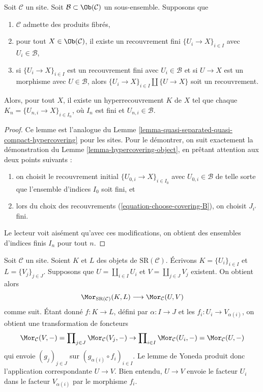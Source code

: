 \begin{lemma}
\label{lemma-w-contractible}
Soit $\mathcal{C}$ un site. Soit $\mathcal{B} \subset \Ob(\mathcal{C})$
un sous-ensemble. Supposons que
\begin{enumerate}
\item $\mathcal{C}$ admette des produits fibrés,
\item pour tout $X \in \Ob(\mathcal{C})$, il existe un recouvrement fini
$\{U_i \to X\}_{i \in I}$ avec $U_i \in \mathcal{B}$,
\item si $\{U_i \to X\}_{i \in I}$ est un recouvrement fini avec
$U_i \in \mathcal{B}$ et si $U \to X$ est un morphisme avec $U \in \mathcal{B}$,
alors $\{U_i \to X\}_{i \in I} \amalg \{U \to X\}$ soit un recouvrement.
\end{enumerate}
Alors, pour tout $X$, il existe un hyperrecouvrement $K$ de $X$
tel que chaque $K_n = \{U_{n, i} \to X\}_{i \in I_n}$, où
$I_n$ est fini et $U_{n, i} \in \mathcal{B}$.
\end{lemma}

\begin{proof}
Ce lemme est l'analogue du
Lemme \ref{lemma-quasi-separated-quasi-compact-hypercovering}
pour les sites. Pour le démontrer, on suit exactement la démonstration du
Lemme \ref{lemma-hypercovering-object},
en prêtant attention aux deux points suivants :
\begin{enumerate}
\item[(a)] on choisit le recouvrement initial $\{U_{0, i} \to X\}_{i \in I_0}$
avec $U_{0, i} \in \mathcal{B}$ de telle sorte que l'ensemble d'indices $I_0$ soit fini, et
\item[(b)] lors du choix des recouvrements
(\ref{equation-choose-covering-B}),
on choisit $J_{i'}$ fini.
\end{enumerate}
Le lecteur voit aisément qu'avec ces modifications, on obtient
des ensembles d'indices finis $I_n$ pour tout $n$.
\end{proof}

\begin{remark}
\label{remark-taking-disjoint-unions}
Soit $\mathcal{C}$ un site. Soient
$K$ et $L$ des objets de $\text{SR}(\mathcal{C})$.
Écrivons $K = \{U_i\}_{i \in I}$ et $L = \{V_j\}_{j \in J}$.
Supposons que $U = \coprod_{i \in I} U_i$ et $V = \coprod_{j \in J} V_j$
existent. On obtient alors
$$
\Mor_{\text{SR}(\mathcal{C})}(K, L) \longrightarrow \Mor_\mathcal{C}(U, V)
$$
comme suit. Étant donné $f : K \to L$, défini par $\alpha : I \to J$
et les $f_i : U_i \to V_{\alpha(i)}$, on obtient une transformation de foncteurs
$$
\Mor_\mathcal{C}(V, -) =
\prod\nolimits_{j \in J} \Mor_\mathcal{C}(V_j, -)
\to
\prod\nolimits_{i \in I} \Mor_\mathcal{C}(U_i, -) =
\Mor_\mathcal{C}(U, -)
$$
qui envoie $(g_j)_{j \in J}$ sur
$(g_{\alpha(i)} \circ f_i)_{i \in I}$. Le lemme de Yoneda
produit donc l'application correspondante $U \to V$. Bien entendu, $U \to V$
envoie le facteur $U_i$ dans le facteur $V_{\alpha(i)}$ par
le morphisme $f_i$.
\end{remark}

